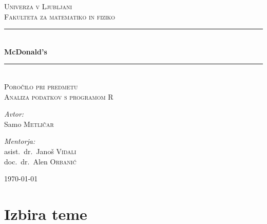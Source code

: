 \documentclass[hidelinks, 11pt,a4paper]{article}
\begin{document}
\newcommand{\HRule}{\rule{\linewidth}{0.5mm}}

\begin{titlepage}
\begin{center}

\textsc{Univerza v Ljubljani}\\
\textsc{\large Fakulteta za matematiko in fiziko}\\[5cm] %

\HRule \\[0.3cm]
{\huge \bfseries McDonald's} \\
\HRule \\[0.5cm]

\textsc{\Large Poročilo pri predmetu \\ \LARGE Analiza podatkov s programom R} \\[4cm]

\noindent
\begin{minipage}{0.4\textwidth}
\begin{flushleft} \large
\emph{Avtor:}\\
Samo \textsc{Metličar}
\end{flushleft}
\end{minipage}%
\begin{minipage}{0.4\textwidth}
\begin{flushright} \large
\emph{Mentorja:} \\
asist.~dr.~Janoš \textsc{Vidali} \\
doc.~dr.~Alen \textsc{Orbanić}
\end{flushright}
\end{minipage}

\vfill

{\large \today}


\end{center}
\end{titlepage}

\tableofcontents


\newpage
\section{Izbira teme}
\end{document}
